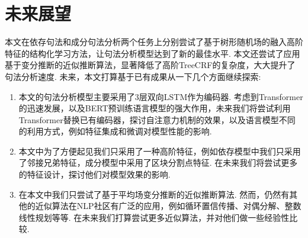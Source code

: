 \section{未来展望}
本文在依存句法和成分句法分析两个任务上分别尝试了基于树形随机场的融入高阶特征的结构化学习方法，让句法分析模型达到了新的最佳水平.
本文还尝试了应用基于变分推断的近似推断算法，显著降低了高阶TreeCRF的复杂度，大大提升了句法分析速度.
未来，本文打算基于已有成果从一下几个方面继续探索:
\begin{enumerate}
  \item 本文的句法分析模型主要采用了3层双向LSTM作为编码器.
        考虑到Transformer的迅速发展，以及BERT预训练语言模型的强大作用，未来我们将尝试利用Transformer替换已有编码器，探讨自注意力机制的效果，以及语言模型不同的利用方式，例如特征集成和微调对模型性能的影响.
  \item 本文中为了方便起见我们只采用了一种高阶特征，例如依存模型中我们只采用了邻接兄弟特征，成分模型中采用了区块分割点特征.
        在未来我们将尝试更多的特征设计，探讨他们对模型效果的影响.
  \item 在本文中我们只尝试了基于平均场变分推断的近似推断算法.
        然而，仍然有其他的近似算法在NLP社区有广泛的应用，例如循环置信传播、对偶分解、整数线性规划等等.
        在未来我们打算尝试更多近似算法，并对他们做一些经验性比较.
\end{enumerate}